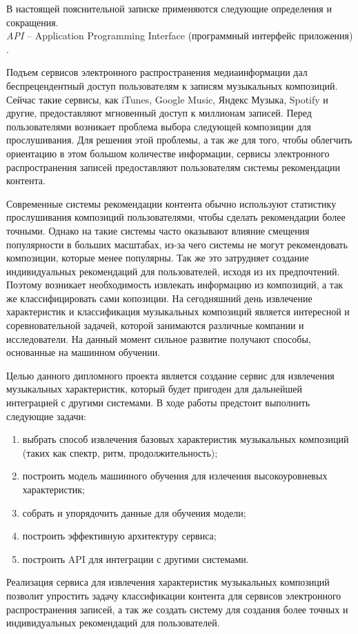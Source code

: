 \label{sec:definitions}

В настоящей пояснительной записке применяются следующие определения и сокращения.
\\

\emph{API} -- Application Programming Interface (программный интерфейс приложения) \cite{istqb_specification}.


\label{sec:introduction}


Подъем сервисов электронного распространения медиаинформации дал беспрецендентный доступ пользователям к записям музыкальных композиций. Сейчас такие сервисы, как iTunes, Google Music, Яндекс Музыка, Spotify и другие, предоставляют мгновенный доступ к миллионам записей. Перед пользователями возникает проблема выбора следующей композиции для прослушивания. Для решения этой проблемы, а так же для того, чтобы облегчить ориентацию в этом большом количестве информации, сервисы электронного распространения записей предоставляют пользователям системы рекомендации контента.

Современные системы рекомендации контента обычно используют статистику прослушивания композиций пользователями, чтобы сделать рекомендации более точными. Однако на такие системы часто оказывают влияние смещения популярности в больших масштабах, из-за чего системы не могут рекомендовать композиции, которые менее популярны. Так же это затрудняет создание индивидуальных рекомендаций для пользователей, исходя из их предпочтений. Поэтому возникает необходимость извлекать информацию из композиций, а так же классифицировать сами копозиции. На сегодняшний день извлечение характеристик и классификация музыкальных композиций является интересной и соревновательной задачей, которой занимаются различные компании и исследователи. На данный момент сильное развитие получают способы, основанные на машинном обучении.


Целью данного дипломного проекта является создание сервис для извлечения музыкальных характеристик, который будет пригоден для дальнейшей интеграцией с другими системами. В ходе работы предстоит выполнить следующие задачи:
\begin{enumerate}
  \item выбрать способ извлечения базовых характеристик музыкальных композиций (таких как спектр, ритм, продолжительность);
  \item построить модель машинного обучения для излечения высокоуровневых характеристик;
  \item собрать и упорядочить данные для обучения модели;
  \item построить эффективную архитектуру сервиса;
  \item построить API для интеграции с другими системами.
\end{enumerate}


Реализация сервиса для извлечения характеристик музыкальных композиций позволит упростить задачу классификации контента для сервисов электронного распространения записей, а так же создать систему для создания более точных и индивидуальных рекомендаций для пользователей.

